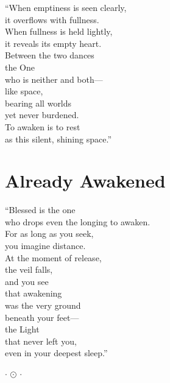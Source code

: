 \documentclass[10pt, openright]{book}
\newcommand{\sectionbreak}{\filbreak}
\newcommand{\ornament}{
    \vspace{1.5cm}
    \begin{center}
        \large \(\cdot\) \(\odot\) \(\cdot\)
    \end{center}
    \vspace{1.5cm}
}
\begin{document}
``When emptiness is seen clearly,\\
it overflows with fullness.\\
When fullness is held lightly,\\
it reveals its empty heart.\\
Between the two dances\\
the One\\
who is neither and both---\\
like space,\\
bearing all worlds\\
yet never burdened.\\
To awaken is to rest\\
as this silent, shining space.''

\sectionbreak

\section{Already Awakened}\label{already-awakened}

``Blessed is the one\\
who drops even the longing to awaken.\\
For as long as you seek,\\
you imagine distance.\\
At the moment of release,\\
the veil falls,\\
and you see\\
that awakening\\
was the very ground\\
beneath your feet---\\
the Light\\
that never left you,\\
even in your deepest sleep.''

\ornament
\end{document}
